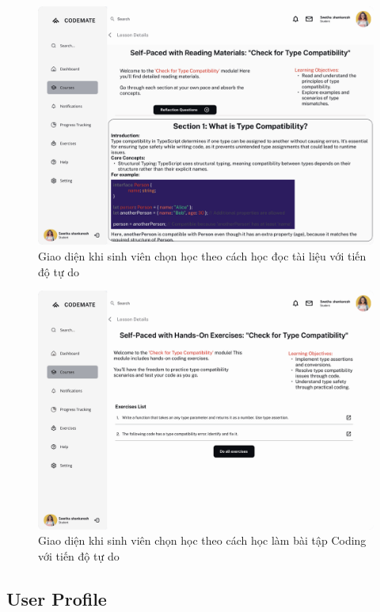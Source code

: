 \begin{figure}[H]
    \centering
    \includegraphics[scale=0.3]{Images/figmaDesign/Detailed Lesson Page - Self Pace Reading Material.png}
    \caption{Giao diện khi sinh viên chọn học theo cách học đọc tài liệu với tiến độ tự do}
    \label{fig:enter-label}
\end{figure}
\begin{figure}[H]
    \centering
    \includegraphics[scale=0.3]{Images/figmaDesign/Detailed Lesson Page - Self Pace Hands On Exercise.png}
    \caption{Giao diện khi sinh viên chọn học theo cách học làm bài tập Coding với tiến độ tự do}
    \label{fig:enter-label}
\end{figure}
\subsection{User Profile}
